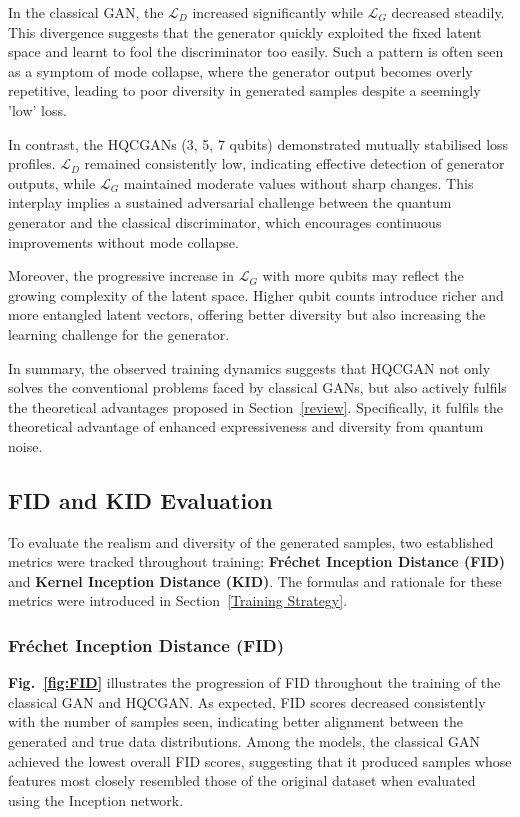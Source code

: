 \documentclass[conference]{IEEEtran}
\begin{document}
In the classical GAN, the $\mathcal{L}_D$ increased significantly while $\mathcal{L}_G$ decreased steadily. This divergence suggests that the generator quickly exploited the fixed latent space and learnt to fool the discriminator too easily. Such a pattern is often seen as a symptom of mode collapse, where the generator output becomes overly repetitive, leading to poor diversity in generated samples despite a seemingly 'low' loss.

In contrast, the HQCGANs (3, 5, 7 qubits) demonstrated mutually stabilised loss profiles. $\mathcal{L}_D$ remained consistently low, indicating effective detection of generator outputs, while $\mathcal{L}_G$ maintained moderate values without sharp changes. This interplay implies a sustained adversarial challenge between the quantum generator and the classical discriminator, which encourages continuous improvements without mode collapse.

Moreover, the progressive increase in $\mathcal{L}_G$ with more qubits may reflect the growing complexity of the latent space. Higher qubit counts introduce richer and more entangled latent vectors, offering better diversity but also increasing the learning challenge for the generator.

In summary, the observed training dynamics suggests that HQCGAN not only solves the conventional problems faced by classical GANs, but also actively fulfils the theoretical advantages proposed in Section~\ref{review}. Specifically, it fulfils the theoretical advantage of enhanced expressiveness and diversity from quantum noise.

\subsection{FID and KID Evaluation}

To evaluate the realism and diversity of the generated samples, two established metrics were tracked throughout training: \textbf{Fréchet Inception Distance (FID)} and \textbf{Kernel Inception Distance (KID)}. The formulas and rationale for these metrics were introduced in Section~\ref{Training Strategy}.

\subsubsection{Fréchet Inception Distance (FID)}

\textbf{Fig.~\ref{fig:FID}} illustrates the progression of FID throughout the training of the classical GAN and HQCGAN. As expected, FID scores decreased consistently with the number of samples seen, indicating better alignment between the generated and true data distributions. Among the models, the classical GAN achieved the lowest overall FID scores, suggesting that it produced samples whose features most closely resembled those of the original dataset when evaluated using the Inception network.
\end{document}
